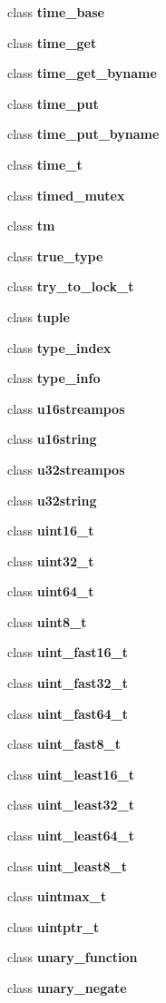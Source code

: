 \begin{DoxyCompactItemize}
class \textbf{ time\+\_\+base}
\item 
class \textbf{ time\+\_\+get}
\item 
class \textbf{ time\+\_\+get\+\_\+byname}
\item 
class \textbf{ time\+\_\+put}
\item 
class \textbf{ time\+\_\+put\+\_\+byname}
\item 
class \textbf{ time\+\_\+t}
\item 
class \textbf{ timed\+\_\+mutex}
\item 
class \textbf{ tm}
\item 
class \textbf{ true\+\_\+type}
\item 
class \textbf{ try\+\_\+to\+\_\+lock\+\_\+t}
\item 
class \textbf{ tuple}
\item 
class \textbf{ type\+\_\+index}
\item 
class \textbf{ type\+\_\+info}
\item 
class \textbf{ u16streampos}
\item 
class \textbf{ u16string}
\item 
class \textbf{ u32streampos}
\item 
class \textbf{ u32string}
\item 
class \textbf{ uint16\+\_\+t}
\item 
class \textbf{ uint32\+\_\+t}
\item 
class \textbf{ uint64\+\_\+t}
\item 
class \textbf{ uint8\+\_\+t}
\item 
class \textbf{ uint\+\_\+fast16\+\_\+t}
\item 
class \textbf{ uint\+\_\+fast32\+\_\+t}
\item 
class \textbf{ uint\+\_\+fast64\+\_\+t}
\item 
class \textbf{ uint\+\_\+fast8\+\_\+t}
\item 
class \textbf{ uint\+\_\+least16\+\_\+t}
\item 
class \textbf{ uint\+\_\+least32\+\_\+t}
\item 
class \textbf{ uint\+\_\+least64\+\_\+t}
\item 
class \textbf{ uint\+\_\+least8\+\_\+t}
\item 
class \textbf{ uintmax\+\_\+t}
\item 
class \textbf{ uintptr\+\_\+t}
\item 
class \textbf{ unary\+\_\+function}
\item 
class \textbf{ unary\+\_\+negate}

\end{DoxyCompactItemize}
